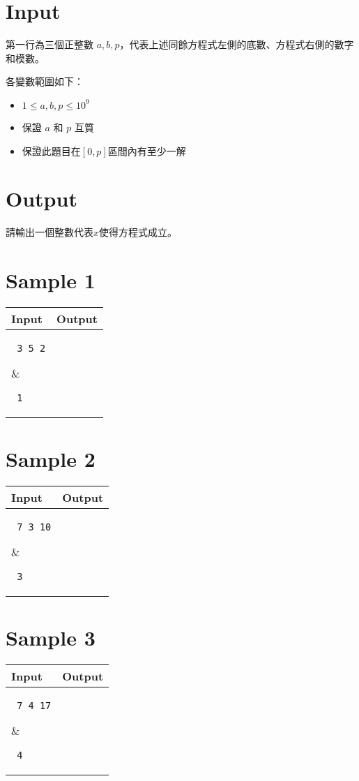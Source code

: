\documentclass[11pt,a4paper]{article}
\begin{document}
\section*{Input}

第一行為三個正整數 $a, b , p$，代表上述同餘方程式左側的底數、方程式右側的數字和模數。

各變數範圍如下：
\begin{itemize}
    \item $1 \le a, b, p \le 10^9$
	\item 保證 $a$ 和 $p$ 互質
	\item 保證此題目在$ [ 0 , p ]$區間內有至少一解
\end{itemize}

\section*{Output}

請輸出一個整數代表$x$使得方程式成立。

\section*{Sample 1}
\begin{longtable}[!h]{|p{}|p{}|}
\hline
\textbf {Input}	& \textbf {Output} \\
\hline
\parbox[t]{0.5\textwidth} %
{ \tt
3 5 2\\
} &
\parbox[t]{0.5\textwidth}
{ \tt
1\\
} \\
\hline
\end{longtable}

\section*{Sample 2}
\begin{longtable}[!h]{|p{}|p{}|}
\hline
\textbf {Input}	& \textbf {Output} \\
\hline
\parbox[t]{0.5\textwidth} %
{ \tt
7 3 10\\
} &
\parbox[t]{0.5\textwidth}
{ \tt
3 \\
} \\
\hline
\end{longtable}

\section*{Sample 3}
\begin{longtable}[!h]{|p{}|p{}|}
\hline
\textbf {Input}	& \textbf {Output} \\
\hline
\parbox[t]{0.5\textwidth} %
{ \tt
7 4 17 \\
} &
\parbox[t]{0.5\textwidth}
{ \tt
4 \\
} \\
\hline
\end{longtable}
\end{document}
